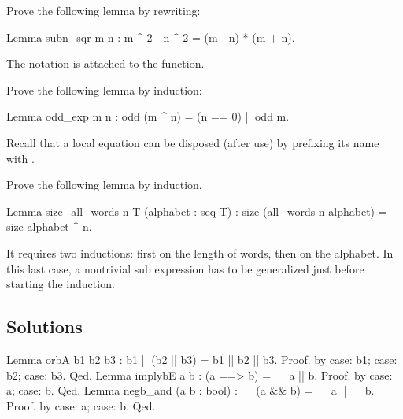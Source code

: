 \begin{Exercise}[label=ex:rewrite,difficulty=0,title={Rewriting}]

Prove the following lemma by rewriting:

\begin{coq}{}{}
Lemma subn_sqr m n : m ^ 2 - n ^ 2 = (m - n) * (m + n).
\end{coq}
The \C{(_ ^ _)} notation is attached to the  function.

\end{Exercise}

\begin{Exercise}[label=ex:induction,difficulty=1,title={Induction}]

Prove the following lemma by induction:

\begin{coq}{}{}
Lemma odd_exp m n : odd (m ^ n) = (n == 0) || odd m.
\end{coq}
Recall that a local equation can be disposed (after use)
by prefixing its name with \C{\{\}}.

\end{Exercise}


\begin{Exercise}[label=ex:induction2,difficulty=2,title={Multiple induction}]

Prove the following lemma by induction.

\begin{coq}{}{}
Lemma size_all_words n T (alphabet : seq T) :
  size (all_words n alphabet) = size alphabet ^ n.
\end{coq}

It requires two inductions: first on the length of words,
then on the alphabet.  In this last case, a nontrivial
sub expression has to be generalized just before starting
the induction.

\end{Exercise}

\subsection{Solutions}

\begin{Answer}[ref=ex:boolid]

\begin{coq}{}{}
Lemma orbA b1 b2 b3 : b1 || (b2 || b3) = b1 || b2 || b3.
Proof. by case: b1; case: b2; case: b3. Qed.
Lemma implybE a b : (a ==> b) = ~~ a || b.
Proof. by case: a; case: b. Qed.
Lemma negb_and (a b : bool) : ~~ (a && b) = ~~ a || ~~ b.
Proof. by case: a; case: b. Qed.
\end{coq}
\end{Answer}

